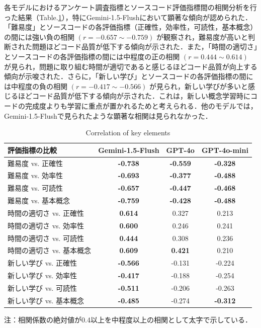 \documentclass[twocolumn, fleqn, uplatex]{jsarticle}
\begin{document}
各モデルにおけるアンケート調査指標とソースコード評価指標間の相関分析を行った結果（Table.\ref{tab:correlation_results_focused}），特にGemini-1.5-Flushにおいて顕著な傾向が認められた．「難易度」とソースコードの各評価指標（正確性，効率性，可読性，基本概念）の間には強い負の相関 $(r=−0.657\sim−0.759)$ が観察され，難易度が高いと判断された問題ほどコード品質が低下する傾向が示された．また，「時間の適切さ」とソースコードの各評価指標の間には中程度の正の相関 $(r=0.444\sim0.614)$ が見られ，問題に取り組む時間が適切であると感じるほどコード品質が向上する傾向が示唆された．さらに，「新しい学び」とソースコードの各評価指標の間には中程度の負の相関 $(r=−0.417\sim−0.566)$ が見られ，新しい学びが多いと感じるほどコード品質が低下する傾向が示された．これは，新しい概念学習時にコードの完成度よりも学習に重点が置かれるためと考えられる．他のモデルでは，Gemini-1.5-Flushで見られたような顕著な相関は見られなかった．

\begin{table}[t]
\centering
\scriptsize
\caption{Correlation of key elements}
\label{tab:correlation_results_focused}
\begin{threeparttable}
\begin{tabular}{lccc}
\hline
評価指標の比較 & Gemini-1.5-Flush & GPT-4o & GPT-4o-mini \\
\hline
難易度 vs. 正確性 & \textbf{-0.738} & \textbf{-0.559} & \textbf{-0.328} \\
難易度 vs. 効率性 & \textbf{-0.693} & \textbf{-0.377} & \textbf{-0.488} \\
難易度 vs. 可読性 & \textbf{-0.657} & \textbf{-0.447} & \textbf{-0.468} \\
難易度 vs. 基本概念 & \textbf{-0.759} & \textbf{-0.428} & \textbf{-0.488} \\
\hline
時間の適切さ vs. 正確性 & \textbf{0.614} & 0.327 & 0.213 \\
時間の適切さ vs. 効率性 & \textbf{0.600} & 0.246 & 0.241 \\
時間の適切さ vs. 可読性 & \textbf{0.444} & 0.308 & 0.236 \\
時間の適切さ vs. 基本概念 & \textbf{0.609} & \textbf{0.421} & 0.210 \\
\hline
新しい学び vs. 正確性 & \textbf{-0.566} & -0.131 & -0.224 \\
新しい学び vs. 効率性 & \textbf{-0.417} & -0.188 & -0.254 \\
新しい学び vs. 可読性 & \textbf{-0.511} & -0.206 & -0.263 \\
新しい学び vs. 基本概念 & \textbf{-0.485} & -0.274 & \textbf{-0.312} \\
\hline
\end{tabular}
\begin{tablenotes}
\small
\item 注：相関係数の絶対値が0.4以上を中程度以上の相関として太字で示している．
\end{tablenotes}
\end{threeparttable}
\end{table}
\end{document}
